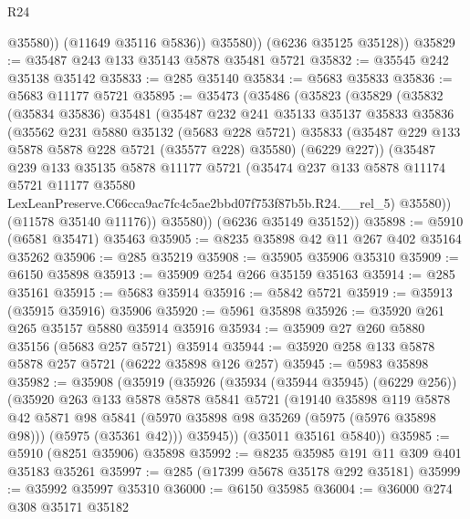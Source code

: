 \begin{lexlean}{R24}
\begin{coremodule}
                @35580))
            (@11649 @35116 @5836))
          @35580))
      (@6236 @35125 @35128))
@35829 := @35487 @243 @133 @35143 @5878 @35481 @5721
@35832 := @35545 @242 @35138 @35142
@35833 := @285 @35140
@35834 := @5683 @35833
@35836 := @5683 @11177 @5721
@35895 := @35473
    (@35486
      (@35823
        (@35829
          (@35832
            (@35834 @35836)
            @35481
            (@35487
              @232
              @241
              @35133
              @35137
              @35833
              @35836
              (@35562
                @231
                @5880
                @35132
                (@5683 @228 @5721)
                @35833
                (@35487 @229 @133 @5878 @5878 @228 @5721 (@35577 @228) @35580)
                (@6229 @227))
              (@35487
                @239
                @133
                @35135
                @5878
                @11177
                @5721
                (@35474
                  @237
                  @133
                  @5878
                  @11174
                  @5721
                  @11177
                  @35580
                  LexLeanPreserve.C66cca9ac7fc4c5ae2bbd07f753f87b5b.R24.__rel_5)
                @35580))
            (@11578 @35140 @11176))
          @35580))
      (@6236 @35149 @35152))
@35898 := @5910 (@6581 @35471) @35463
@35905 := @8235 @35898 @42 @11 @267 @402 @35164 @35262
@35906 := @285 @35219
@35908 := @35905 @35906 @35310
@35909 := @6150 @35898
@35913 := @35909 @254 @266 @35159 @35163
@35914 := @285 @35161
@35915 := @5683 @35914
@35916 := @5842 @5721
@35919 := @35913 (@35915 @35916) @35906
@35920 := @5961 @35898
@35926 := @35920 @261 @265 @35157 @5880 @35914 @35916
@35934 := @35909 @27 @260 @5880 @35156 (@5683 @257 @5721) @35914
@35944 := @35920 @258 @133 @5878 @5878 @257 @5721 (@6222 @35898 @126 @257)
@35945 := @5983 @35898
@35982 := @35908
    (@35919
      (@35926
        (@35934 (@35944 @35945) (@6229 @256))
        (@35920
          @263
          @133
          @5878
          @5878
          @5841
          @5721
          (@19140
            @35898
            @119
            @5878
            @42
            @5871
            @98
            @5841
            (@5970 @35898 @98 @35269 (@5975 (@5976 @35898 @98)))
            (@5975 (@35361 @42)))
          @35945))
      (@35011 @35161 @5840))
@35985 := @5910 (@8251 @35906) @35898
@35992 := @8235 @35985 @191 @11 @309 @401 @35183 @35261
@35997 := @285 (@17399 @5678 @35178 @292 @35181)
@35999 := @35992 @35997 @35310
@36000 := @6150 @35985
@36004 := @36000 @274 @308 @35171 @35182

\end{coremodule}
\end{lexlean}

